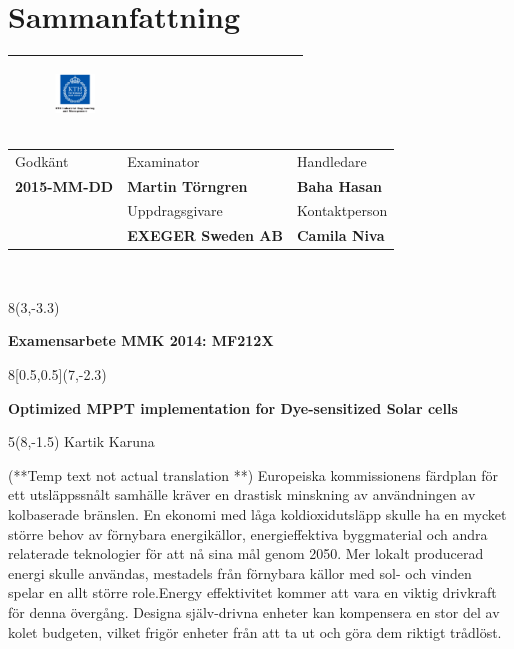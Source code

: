 \chapter*{Sammanfattning}
\thispagestyle{begin}

\begin{tabular}{ | p{\dimexpr \linewidth-2\tabcolsep} |} \hline
 \begin{figure}[H]
        
        \includegraphics[width=0.2\textwidth]{images/indust} 
             \end{figure}  \\\hline
\end{tabular}   
\begin{tabular}{ | p{} |
                  p{} |
                  p{} |} \hline
                 Godkänt & Examinator & Handledare \\
                  \textbf{2015-MM-DD}  & \textbf{Martin Törngren} & \textbf{Baha Hasan} \\\hline
                   & Uppdragsgivare & Kontaktperson \\
                   & \textbf{EXEGER Sweden AB} & \textbf{Camila Niva}\\ \hline
\end{tabular} \\
\begin{textblock}{8}(3,-3.3)
\begin{center}
\textbf{Examensarbete MMK 2014: MF212X }
\end{center}
\end{textblock}
\begin{textblock}{8}[0.5,0.5](7,-2.3)
\begin{center}
\textbf{Optimized MPPT implementation for Dye-sensitized Solar cells}
\end{center}
\end{textblock}
\begin{textblock}{5}(8,-1.5)
Kartik Karuna
\end{textblock}
(**Temp text not actual translation **)
Europeiska kommissionens färdplan för ett utsläppssnålt samhälle kräver en drastisk minskning av användningen av kolbaserade bränslen. En ekonomi med låga koldioxidutsläpp skulle ha en mycket större behov av förnybara energikällor, energieffektiva byggmaterial och andra relaterade teknologier för att nå sina mål genom 2050. Mer lokalt producerad energi skulle användas, mestadels från förnybara källor med sol- och vinden spelar en allt större role.Energy effektivitet kommer att vara en viktig drivkraft för denna övergång. Designa själv-drivna enheter kan kompensera en stor del av kolet budgeten, vilket frigör enheter från att ta ut och göra dem riktigt trådlöst.\\

